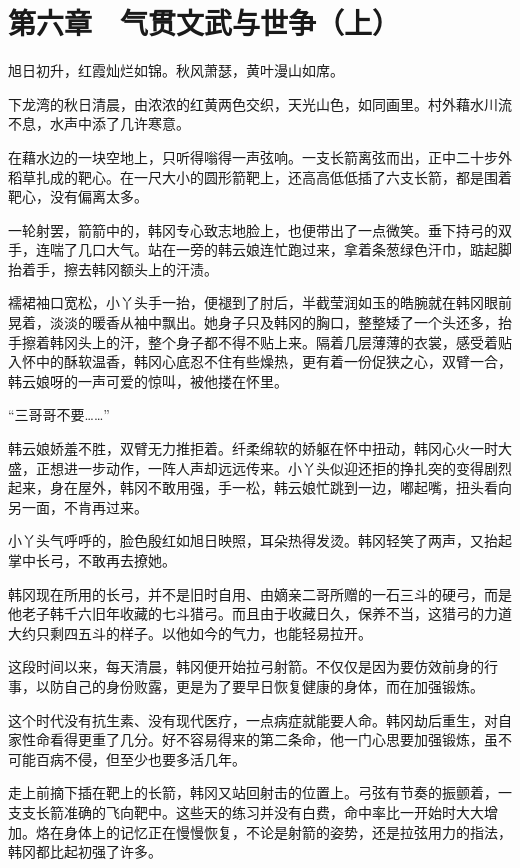 \section{第六章　气贯文武与世争（上）}

旭日初升，红霞灿烂如锦。秋风萧瑟，黄叶漫山如席。

下龙湾的秋日清晨，由浓浓的红黄两色交织，天光山色，如同画里。村外藉水川流不息，水声中添了几许寒意。

在藉水边的一块空地上，只听得嗡得一声弦响。一支长箭离弦而出，正中二十步外稻草扎成的靶心。在一尺大小的圆形箭靶上，还高高低低插了六支长箭，都是围着靶心，没有偏离太多。

一轮射罢，箭箭中的，韩冈专心致志地脸上，也便带出了一点微笑。垂下持弓的双手，连喘了几口大气。站在一旁的韩云娘连忙跑过来，拿着条葱绿色汗巾，踮起脚抬着手，擦去韩冈额头上的汗渍。

襦裙袖口宽松，小丫头手一抬，便褪到了肘后，半截莹润如玉的皓腕就在韩冈眼前晃着，淡淡的暖香从袖中飘出。她身子只及韩冈的胸口，整整矮了一个头还多，抬手擦着韩冈头上的汗，整个身子都不得不贴上来。隔着几层薄薄的衣裳，感受着贴入怀中的酥软温香，韩冈心底忍不住有些燥热，更有着一份促狭之心，双臂一合，韩云娘呀的一声可爱的惊叫，被他搂在怀里。

“三哥哥不要……”

韩云娘娇羞不胜，双臂无力推拒着。纤柔绵软的娇躯在怀中扭动，韩冈心火一时大盛，正想进一步动作，一阵人声却远远传来。小丫头似迎还拒的挣扎突的变得剧烈起来，身在屋外，韩冈不敢用强，手一松，韩云娘忙跳到一边，嘟起嘴，扭头看向另一面，不肯再过来。

小丫头气呼呼的，脸色殷红如旭日映照，耳朵热得发烫。韩冈轻笑了两声，又抬起掌中长弓，不敢再去撩她。

韩冈现在所用的长弓，并不是旧时自用、由嫡亲二哥所赠的一石三斗的硬弓，而是他老子韩千六旧年收藏的七斗猎弓。而且由于收藏日久，保养不当，这猎弓的力道大约只剩四五斗的样子。以他如今的气力，也能轻易拉开。

这段时间以来，每天清晨，韩冈便开始拉弓射箭。不仅仅是因为要仿效前身的行事，以防自己的身份败露，更是为了要早日恢复健康的身体，而在加强锻炼。

这个时代没有抗生素、没有现代医疗，一点病症就能要人命。韩冈劫后重生，对自家性命看得更重了几分。好不容易得来的第二条命，他一门心思要加强锻炼，虽不可能百病不侵，但至少也要多活几年。

走上前摘下插在靶上的长箭，韩冈又站回射击的位置上。弓弦有节奏的振颤着，一支支长箭准确的飞向靶中。这些天的练习并没有白费，命中率比一开始时大大增加。烙在身体上的记忆正在慢慢恢复，不论是射箭的姿势，还是拉弦用力的指法，韩冈都比起初强了许多。

